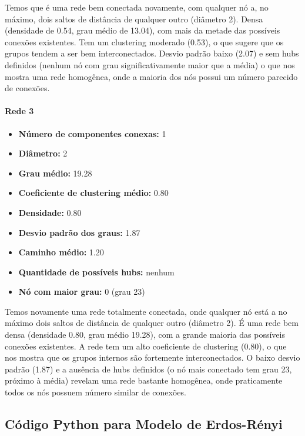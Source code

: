 \documentclass[a4paper]{article}
\begin{document}
Temos que é uma rede bem conectada novamente, com qualquer nó a, no máximo, dois saltos de distância de qualquer outro (diâmetro 2). Densa (densidade de 0.54, grau médio de 13.04), com mais da metade das possíveis conexões existentes. Tem um clustering moderado (0.53), o que sugere que os grupos tendem a ser bem interconectados. Desvio padrão baixo (2.07) e sem hubs definidos (nenhum nó com grau significativamente maior que a média) o que nos mostra uma rede homogênea, onde a maioria dos nós possui um número parecido de conexões. 

\paragraph{Rede 3}
\begin{itemize}
    \item \textbf{Número de componentes conexas:} 1
    \item \textbf{Diâmetro:} 2
    \item \textbf{Grau médio:} 19.28
    \item \textbf{Coeficiente de clustering médio:} 0.80
    \item \textbf{Densidade:} 0.80
    \item \textbf{Desvio padrão dos graus:} 1.87
    \item \textbf{Caminho médio:} 1.20
    \item \textbf{Quantidade de possíveis hubs:} nenhum
    \item \textbf{Nó com maior grau:} 0 (grau 23)
\end{itemize}

Temos novamente uma rede totalmente conectada, onde qualquer nó está a no máximo dois saltos de distância de qualquer outro (diâmetro 2). É uma rede bem densa (densidade 0.80, grau médio 19.28), com a grande maioria das possíveis conexões existentes. A rede tem um alto coeficiente de clustering (0.80), o que nos mostra que os grupos internos são fortemente interconectados. O baixo desvio padrão (1.87) e a ausência de hubs definidos (o nó mais conectado tem grau 23, próximo à média) revelam uma rede bastante homogênea, onde praticamente todos os nós possuem número similar de conexões.


\vspace{0.5cm}
\subsection{Código Python para Modelo de Erdos-Rényi}
\end{document}
